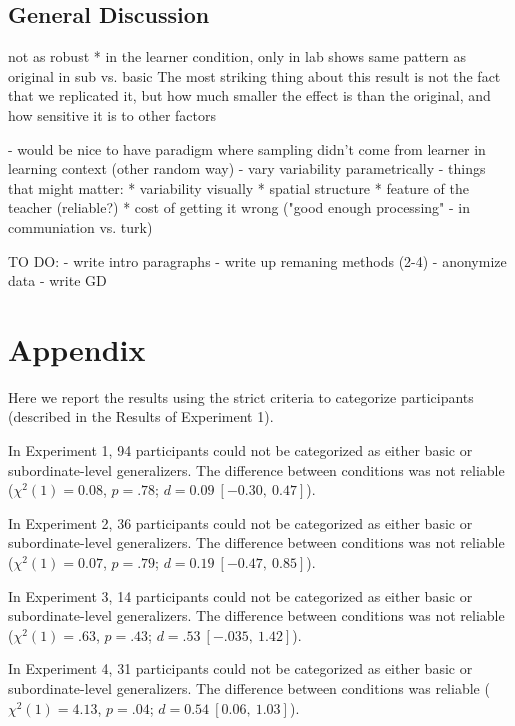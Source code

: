 \documentclass[man]{apa2}
\begin{document}
\subsection{General Discussion}
not as robust
* in the learner condition, only in lab shows same pattern as original in sub vs. basic
The most striking thing about this result is not the fact that we replicated it, but how much smaller the effect is than the original, and how sensitive it is to other factors

- would be nice to have paradigm where sampling didn't come from learner in learning context (other random way)
- vary variability parametrically
- things that might matter:
* variability visually
* spatial structure
* feature of the teacher (reliable?)
* cost of getting it wrong ("good enough processing" - in communiation vs. turk)

TO DO:
- write intro paragraphs
- write up remaning methods (2-4)
- anonymize data
- write GD

\section{Appendix}

Here we report the results using the strict criteria to categorize participants (described in the Results of Experiment 1).

In Experiment 1, 94 participants could not be categorized as either basic or subordinate-level generalizers. The difference between conditions was not reliable ($\chi^2(1) = 0.08$,  $p = .78$; $d = 0.09\ [-0.30,\ 0.47]$).

In Experiment 2,  36 participants could not be categorized as either basic or subordinate-level generalizers. The difference between conditions was not reliable ($\chi^2(1) = 0.07$,  $p = .79$; $d =0.19\ [-0.47,\ 0.85]$).

In Experiment 3,  14 participants could not be categorized as either basic or subordinate-level generalizers. The difference between conditions was not reliable ($\chi^2(1) = .63$,  $p = .43$; $d =.53\ [-.035,\ 1.42]$).

In Experiment 4,  31 participants could not be categorized as either basic or subordinate-level generalizers. The difference between conditions was reliable ($\chi^2(1) = 4.13$,  $p = .04$; $d =0.54\ [0.06,\ 1.03]$).


\nocite{sanchez2003effect}




\newpage
\theappendix 
\end{document}
